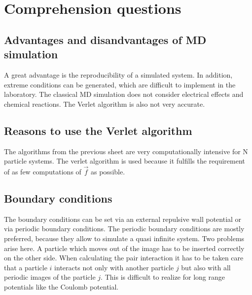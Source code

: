\setcounter{section}{-1}
\section{Comprehension questions}
\subsection{Advantages and disandvantages of MD simulation}
A great advantage is the reproducibility of a simulated system.
In addition, extreme conditions can be generated, which are difficult to implement in the laboratory.
The classical MD simulation does not consider electrical effects and chemical reactions.
The Verlet algorithm is also not very accurate.
\subsection{Reasons to use the Verlet algorithm}
The algorithms from the previous sheet are very computationally intensive for N particle systems.
The verlet algorithm is used because it fulfills the requirement of as few computations of $\vec{f}$ as possible.
\subsection{Boundary conditions}

The boundary conditions can be set via an external repulsive wall potential or via periodic boundary conditions. 
The periodic boundary conditions are mostly preferred, because they allow to simulate a quasi infinite system.
Two problems arise here. A particle which moves out of the image has to be inserted correctly on the other side. When calculating the pair interaction it has to be taken care that a particle $i$ interacts not only with another particle $j$ but also with all periodic images of the particle $j$.
This is difficult to realize for long range potentials like the Coulomb potential. 

